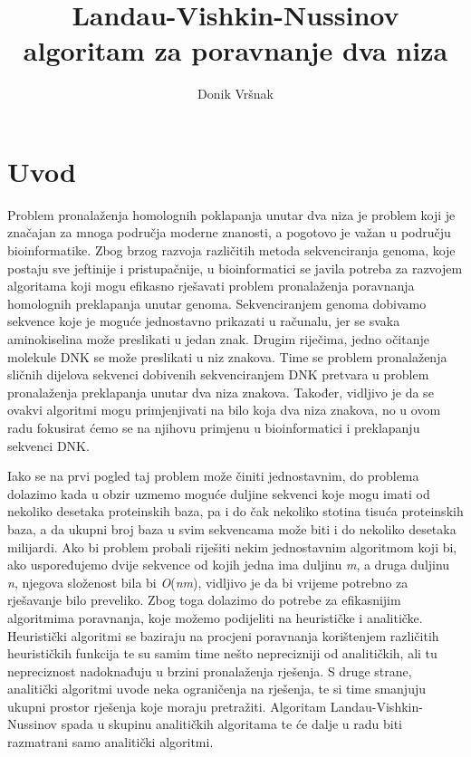 \documentclass[times, utf8, zavrsni]{fer}
\begin{document}

\title{Landau-Vishkin-Nussinov algoritam za poravnanje dva niza}

\author{Donik Vršnak}

\maketitle

\izvornik

\zahvala{}

\tableofcontents

\chapter{Uvod}
Problem pronalaženja homolognih poklapanja unutar dva niza je problem koji je značajan za mnoga područja moderne znanosti, a pogotovo je važan u području bioinformatike. Zbog brzog razvoja različitih metoda sekvenciranja genoma, koje postaju sve jeftinije i pristupačnije, u bioinformatici se javila potreba za razvojem algoritama koji mogu efikasno rješavati problem pronalaženja poravnanja homolognih preklapanja unutar genoma. Sekvenciranjem genoma dobivamo sekvence koje je moguće jednostavno prikazati u računalu, jer se svaka aminokiselina može preslikati u jedan znak. Drugim riječima, jedno očitanje molekule DNK se može preslikati u niz znakova. Time se problem pronalaženja sličnih dijelova sekvenci dobivenih sekvenciranjem DNK pretvara u problem pronalaženja preklapanja unutar dva niza znakova. Također, vidljivo je da se ovakvi algoritmi mogu primjenjivati na bilo koja dva niza znakova, no u ovom radu fokusirat ćemo se na njihovu primjenu u bioinformatici i preklapanju sekvenci DNK.

Iako se na prvi pogled taj problem može činiti jednostavnim, do problema dolazimo kada u obzir uzmemo moguće duljine sekvenci koje mogu imati od nekoliko desetaka proteinskih baza, pa i do čak nekoliko stotina tisuća proteinskih baza, a da ukupni broj baza u svim sekvencama može biti i do nekoliko desetaka milijardi. Ako bi problem probali riješiti nekim jednostavnim algoritmom koji bi, ako uspoređujemo dvije sekvence od kojih jedna ima duljinu \textit{m}, a druga duljinu \textit{n}, njegova složenost bila bi \textit{O}(\textit{nm}), vidljivo je da bi vrijeme potrebno za rješavanje bilo preveliko. Zbog toga dolazimo do potrebe za efikasnijim algoritmima poravnanja, koje možemo podijeliti na heurističke i analitičke. Heuristički algoritmi se baziraju na procjeni poravnanja korištenjem različitih heurističkih funkcija te su samim time nešto neprecizniji od analitičkih, ali tu nepreciznost nadoknađuju u brzini pronalaženja rješenja. S druge strane, analitički algoritmi uvode neka ograničenja na rješenja, te si time smanjuju ukupni prostor rješenja koje moraju pretražiti. Algoritam Landau-Vishkin-Nussinov spada u skupinu analitičkih algoritama te će dalje u radu biti razmatrani samo analitički algoritmi.
\end{document}
